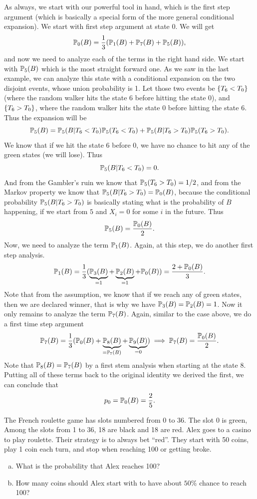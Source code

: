 \begin{solution}
	As always, we start with our powerful tool in hand, which is the first step argument (which is basically a special form of the more general conditional expansion). We start with first step argument at state $0$. We will get
	\[ \mathbb{P}_0(B) = \frac{1}{3} (\mathbb{P}_1(B) + \mathbb{P}_7(B) + \mathbb{P}_5(B) ), \]
	and now we need to analyze each of the terms in the right hand side. We start with $\mathbb{P}_5(B)$ which is the most straight forward one. As we saw in the last example, we can analyze this state with a conditional expansion on the two disjoint events, whose union probability is 1. Let those two events be $\{T_6 < T_0\}$ (where the random walker hits the state $6$ before hitting the state $0$), and $\{T_6 > T_0\}$, where the random walker hits the state $0$ before hitting the state $6$. Thus the expansion will be
	\[ \mathbb{P}_5(B) = \mathbb{P}_5(B|T_6 < T_0) \mathbb{P}_5(T_6 < T_0) + \mathbb{P}_5(B|T_6 > T_0)\mathbb{P}_5(T_6 > T_0). \]
	We know that if we hit the state $6$ before $0$, we have no chance to hit any of the green states (we will lose). Thus
	\[ \mathbb{P}_5(B|T_6<T_0) = 0. \]
	And from the Gambler's ruin we know that $\mathbb{P}_5(T_6>T_0) = 1/2$, and from the Markov property we know that $\mathbb{P}_5(B|T_6>T_0) = \mathbb{P}_0(B)$, because the conditional probability $\mathbb{P}_5(B|T_6>T_0)$ is basically stating what is the probability of $B$ happening, if we start from $5$ and $X_i = 0$ for some $i$ in the future. Thus 
	\[ \mathbb{P}_5(B) = \frac{\mathbb{P}_0(B)}{2}. \]
	Now, we need to analyze the term $\mathbb{P}_1(B)$. Again, at this step, we do another first step analysis.
	\[  \mathbb{P}_1(B) = \frac{1}{3} (\underbrace{\mathbb{P}_3(B)}_{=1} + \underbrace{\mathbb{P}_2(B)}_{=1} +\mathbb{P}_0(B)) = \frac{2+\mathbb{P}_0(B)}{3}. \]
	Note that from the assumption, we know that if we reach any of green states, then we are declared winner, that is why we have $\mathbb{P}_3(B) = \mathbb{P}_2(B) = 1$. Now it only remains to analyze the term $\mathbb{P}_7(B)$. Again, similar to the case above, we do a first time step argument
	\[ \mathbb{P}_7(B) = \frac{1}{3} ( \mathbb{P}_0(B) + \underbrace{\mathbb{P}_8(B)}_{=\mathbb{P}_7(B)} + \underbrace{\mathbb{P}_9(B)}_{=0} ) \implies \mathbb{P}_7(B) = \frac{\mathbb{P}_0(B)}{2}.\]
	Note that $\mathbb{P}_8(B) = \mathbb{P}_7(B)$ by a first stem analysis when starting at the state $8$. Putting all of these terms back to the original identity we derived the first, we can conclude that 
	\[ p_0 = \mathbb{P}_0(B) = \frac{2}{5}. \]
\end{solution}


\begin{problem}
	The French roulette game has slots numbered from 0 to 36. The slot 0 is green, Among the slots from 1 to 36, 18 are black and 18 are red. Alex goes to a casino to play roulette. Their strategy is to always bet ``red''. They start with 50 coins, play 1 coin each turn, and stop when reaching 100 or getting broke.
	\begin{enumerate}[(a)]
		\item What is the probability that Alex reaches 100?
		\item How many coins should Alex start with to have about $50\%$ chance to reach 100?
	\end{enumerate}
\end{problem}

